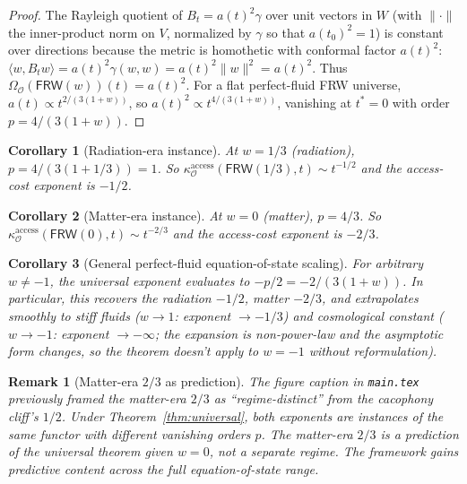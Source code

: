 \documentclass[11pt]{article}
\newtheorem{corollary}{Corollary}
\newtheorem{remark}{Remark}
\newcommand{\Obs}{\mathcal{O}}
\newcommand{\OmegaO}{\Omega_{\Obs}}
\newcommand{\kappaO}{\kappa_{\Obs}}
\newcommand{\Frob}{\mathsf{FRW}}
\begin{document}
\begin{proof}
The Rayleigh quotient of $B_t = a(t)^2 \gamma$ over unit vectors
in $W$ (with $\|\cdot\|$ the inner-product norm on $V$,
normalized by $\gamma$ so that $a(t_0)^2 = 1$) is constant over
directions because the metric is homothetic with conformal factor
$a(t)^2$: $\langle w, B_t w\rangle = a(t)^2 \gamma(w, w) = a(t)^2
\|w\|^2 = a(t)^2$. Thus $\OmegaO(\Frob(w))(t) = a(t)^2$. For a
flat perfect-fluid FRW universe, $a(t) \propto t^{2/(3(1+w))}$,
so $a(t)^2 \propto t^{4/(3(1+w))}$, vanishing at $t^* = 0$ with
order $p = 4/(3(1+w))$.
\end{proof}

\begin{corollary}[Radiation-era instance]
\label{cor:rad}
At $w = 1/3$ (radiation), $p = 4/(3(1 + 1/3)) = 1$. So
$\kappaO^{\mathrm{access}}(\Frob(1/3), t) \sim t^{-1/2}$ and the
access-cost exponent is $-1/2$.
\end{corollary}

\begin{corollary}[Matter-era instance]
\label{cor:mat}
At $w = 0$ (matter), $p = 4/3$. So
$\kappaO^{\mathrm{access}}(\Frob(0), t) \sim t^{-2/3}$ and the
access-cost exponent is $-2/3$.
\end{corollary}

\begin{corollary}[General perfect-fluid equation-of-state scaling]
\label{cor:genw}
For arbitrary $w \neq -1$, the universal exponent evaluates to
$-p/2 = -2/(3(1+w))$. In particular, this recovers the
radiation $-1/2$, matter $-2/3$, and extrapolates smoothly to
stiff fluids ($w \to 1$: exponent $\to -1/3$) and cosmological
constant ($w \to -1$: exponent $\to -\infty$; the expansion is
non-power-law and the asymptotic form changes, so the
theorem doesn't apply to $w = -1$ without reformulation).
\end{corollary}

\begin{remark}[Matter-era $2/3$ as prediction]
\label{rem:matter-prediction}
The figure caption in \texttt{main.tex} previously framed the
matter-era $2/3$ as ``regime-distinct'' from the cacophony
cliff's $1/2$. Under Theorem~\ref{thm:universal},
both exponents are instances of the same functor with different
vanishing orders $p$. The matter-era $2/3$ is a
\emph{prediction} of the universal theorem given $w = 0$, not a
separate regime. The framework gains predictive content across
the full equation-of-state range.
\end{remark}
\end{document}
